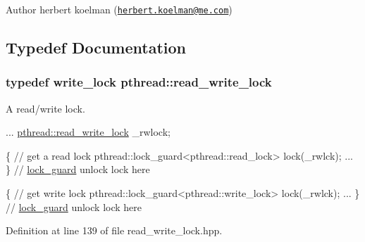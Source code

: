 \begin{DoxyAuthor}{Author}
herbert koelman (\href{mailto:herbert.koelman@me.com}{\tt herbert.\+koelman@me.\+com}) 
\end{DoxyAuthor}


\subsection{Typedef Documentation}
\hypertarget{group__concurrency_ga067fcec8c2b20e2e487c123c2f82d2df}{
\subsubsection[{read\+\_\+write\+\_\+lock}]{\setlength{\rightskip}{0pt plus 5cm}typedef write\+\_\+lock {\bf pthread\+::read\+\_\+write\+\_\+lock}}}\label{group__concurrency_ga067fcec8c2b20e2e487c123c2f82d2df}
A read/write lock.


\begin{DoxyPre}{\ttfamily 
...
\hyperlink{group__concurrency_ga067fcec8c2b20e2e487c123c2f82d2df}{pthread::read\_write\_lock} \_rwlock;}\end{DoxyPre}



\begin{DoxyPre}{\ttfamily \{
  // get a read lock
  pthread::lock\_guard<pthread::read\_lock> lock(\_rwlck);
  ...
\} // \hyperlink{classpthread_1_1lock__guard}{lock\_guard} unlock lock here}\end{DoxyPre}



\begin{DoxyPre}{\ttfamily \{
  // get write lock
  pthread::lock\_guard<pthread::write\_lock> lock(\_rwlck);
  ...
\} // \hyperlink{classpthread_1_1lock__guard}{lock\_guard} unlock lock here}\end{DoxyPre}



\begin{DoxyPre}{\ttfamily }\end{DoxyPre}
 

Definition at line 139 of file read\+\_\+write\+\_\+lock.\+hpp.



